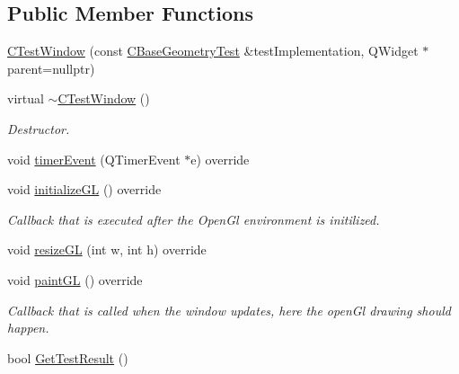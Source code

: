 \subsection*{Public Member Functions}
\begin{DoxyCompactItemize}
\item 
\mbox{\hyperlink{class_unit_test_1_1_c_test_window_a3ee8fe89bc10363e79083d9405fb9b8d}{C\+Test\+Window}} (const \mbox{\hyperlink{class_unit_test_1_1_c_base_geometry_test}{C\+Base\+Geometry\+Test}} \&test\+Implementation, Q\+Widget $\ast$parent=nullptr)
\item 
\mbox{\label{class_unit_test_1_1_c_test_window_a4491b31968f05e18ed630cd50777adde}} 
virtual \mbox{\hyperlink{class_unit_test_1_1_c_test_window_a4491b31968f05e18ed630cd50777adde}{$\sim$\+C\+Test\+Window}} ()
\begin{DoxyCompactList}\small\item\em Destructor. \end{DoxyCompactList}\item 
void \mbox{\hyperlink{class_unit_test_1_1_c_test_window_aa21e809e9efb68f68499e1c32e2df5d9}{timer\+Event}} (Q\+Timer\+Event $\ast$e) override
\item 
\mbox{\label{class_unit_test_1_1_c_test_window_ab3ddc80fbc569917ce0e35b709eca3bd}} 
void \mbox{\hyperlink{class_unit_test_1_1_c_test_window_ab3ddc80fbc569917ce0e35b709eca3bd}{initialize\+GL}} () override
\begin{DoxyCompactList}\small\item\em Callback that is executed after the Open\+Gl environment is initilized. \end{DoxyCompactList}\item 
void \mbox{\hyperlink{class_unit_test_1_1_c_test_window_a2d6a01f4ad96cb0396797a7f2313a7b4}{resize\+GL}} (int w, int h) override
\item 
\mbox{\label{class_unit_test_1_1_c_test_window_a5764e8b9af5f1935fc252ad336b2f28c}} 
void \mbox{\hyperlink{class_unit_test_1_1_c_test_window_a5764e8b9af5f1935fc252ad336b2f28c}{paint\+GL}} () override
\begin{DoxyCompactList}\small\item\em Callback that is called when the window updates, here the open\+Gl drawing should happen. \end{DoxyCompactList}\item 
bool \mbox{\hyperlink{class_unit_test_1_1_c_test_window_a807ee479a1a6b5457482ff2b7b2c2af9}{Get\+Test\+Result}} ()
\end{DoxyCompactItemize}
